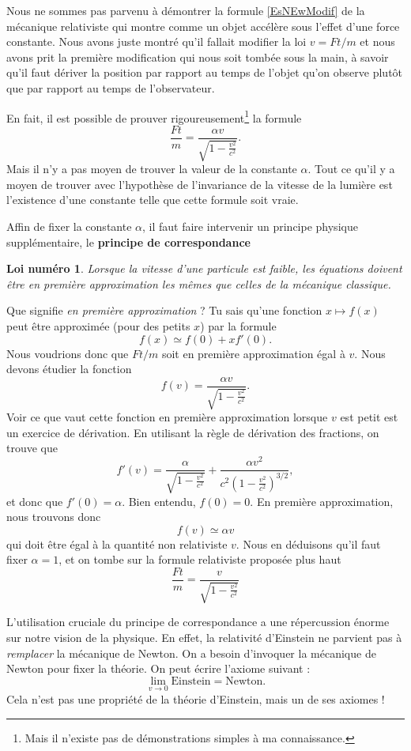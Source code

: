 \documentclass[a4paper,12pt]{book}
\newcounter{numloiphyz}
\theoremstyle{mes_exemples}	\newtheorem{exemple}[numtho]{Exemple}
\theoremstyle{mes_tho}
\newtheorem{loiphyz}[numloiphyz]{Loi numéro}
\newcommand{\defe}[2]{\textbf{#1}\index{#2}}
\begin{document}
Nous ne sommes pas parvenu à démontrer la formule \eqref{EsNEwModif} de la mécanique relativiste qui montre comme un objet accélère sous l'effet d'une force constante. Nous avons juste montré qu'il fallait modifier la loi $v=Ft/m$ et nous avons prit la première modification qui nous soit tombée sous la main, à savoir qu'il faut dériver la position par rapport au temps de l'objet qu'on observe plutôt que par rapport au temps de l'observateur.

En fait, il est possible de prouver rigoureusement\footnote{Mais il n'existe pas de démonstrations simples à ma connaissance.} la formule
\[ 
  \frac{ Ft }{ m }=\frac{ \alpha v }{ \sqrt{1-\frac{ v^2 }{ c^2 }} }.
\]
Mais il n'y a pas moyen de trouver la valeur de la constante $\alpha$. Tout ce qu'il y a moyen de trouver avec l'hypothèse de l'invariance de la vitesse de la lumière est l'existence d'une constante telle que cette formule soit vraie.

Affin de fixer la constante $\alpha$, il faut faire intervenir un principe physique supplémentaire, le \defe{principe de correspondance}{Principe de correspondance}
\begin{loiphyz}
Lorsque la vitesse d'une particule est faible, les équations doivent être en première approximation les mêmes que celles de la mécanique classique.
\end{loiphyz}
Que signifie \emph{en première approximation} ? Tu sais qu'une fonction $x\mapsto f(x)$ peut être approximée (pour des petits $x$) par la formule
\[ 
  f(x)\simeq f(0)+xf'(0).
\]
Nous voudrions donc que $Ft/m$ soit en première approximation égal à $v$. Nous devons étudier la fonction
\[ 
  f(v)=\frac{ \alpha v }{ \sqrt{1-\frac{ v^2 }{ c^2 }} }.
\]
Voir ce que vaut cette fonction en première approximation lorsque $v$ est petit est un exercice de dérivation. En utilisant la règle de dérivation des fractions, on trouve que
\[ 
  f'(v)=\frac{ \alpha }{ \sqrt{1-\frac{ v^2 }{ c^2 }} }+\frac{ \alpha v^2 }{ c^2\left( 1-\frac{ v^2 }{ c^2 } \right)^{3/2} },
\]
et donc que $f'(0)=\alpha$. Bien entendu, $f(0)=0$. En première approximation, nous trouvons donc
\begin{equation}
f(v)\simeq \alpha v
\end{equation}
qui doit être égal à la quantité non relativiste $v$. Nous en déduisons qu'il faut fixer $\alpha=1$, et on tombe sur la formule relativiste proposée plus haut
\[ 
  \frac{ Ft }{ m }=\frac{ v }{ \sqrt{1-\frac{ v^2 }{ c^2 }} }
\]

L'utilisation cruciale du principe de correspondance a une répercussion énorme sur notre vision de la physique. En effet, la relativité d'Einstein ne parvient pas à \emph{remplacer} la mécanique de Newton. On a besoin d'invoquer la mécanique de Newton pour fixer la théorie. On peut écrire l'axiome suivant :
\begin{equation}
 \lim_{v\to 0}\text{Einstein}=\text{Newton}.
\end{equation}
Cela n'est pas une propriété de la théorie d'Einstein, mais un de ses axiomes !
\end{document}
